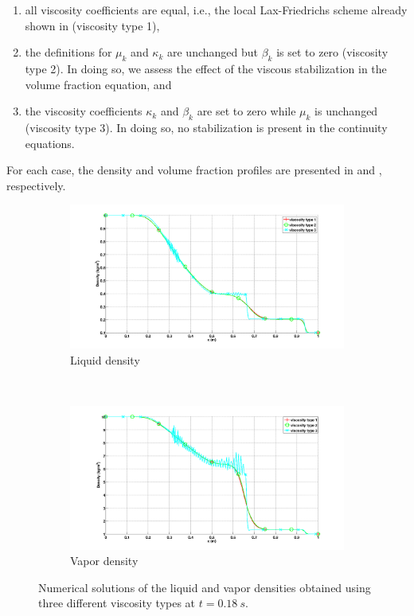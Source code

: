 \documentclass[preprint,10pt]{elsarticle}
\begin{document}
\begin{enumerate}
\item all viscosity coefficients are equal, i.e., the local Lax-Friedrichs scheme already shown in  (viscosity type 1), 
\item the definitions for $\mu_k$ and $\kappa_k$ are unchanged but $\beta_k$ is set to zero (viscosity type 2). In doing so, we assess the effect 
of the viscous stabilization in the volume fraction equation, and 
\item the viscosity coefficients $\kappa_k$ and $\beta_k$ are set to zero while $\mu_k$ is unchanged (viscosity type 3). In doing so, no stabilization is present in the continuity equations. 
\end{enumerate}
For each case, the density and volume fraction profiles are presented in  and , respectively.
%
\begin{figure}[H]
        \centering
        \begin{subfigure}[b]{0.95\textwidth}
                \centering
                \includegraphics[width=\textwidth]{../figures/paper/relaxation_vapor_density_multiple_visc.png}
                \caption{Liquid density}
                \label{fig:liq-density}
        \end{subfigure}
				\\
        \begin{subfigure}[b]{0.95\textwidth}
                \centering
                \includegraphics[width=\textwidth]{../figures/paper/relaxation_liquid_density_multiple_visc.png}
                \caption{Vapor density}
                \label{fig:vap-density}
        \end{subfigure}
        \caption{Numerical solutions of the liquid and vapor densities obtained using three different viscosity types at $t=0.18 \ s$.}\label{fig:density}
\end{figure}
\end{document}
